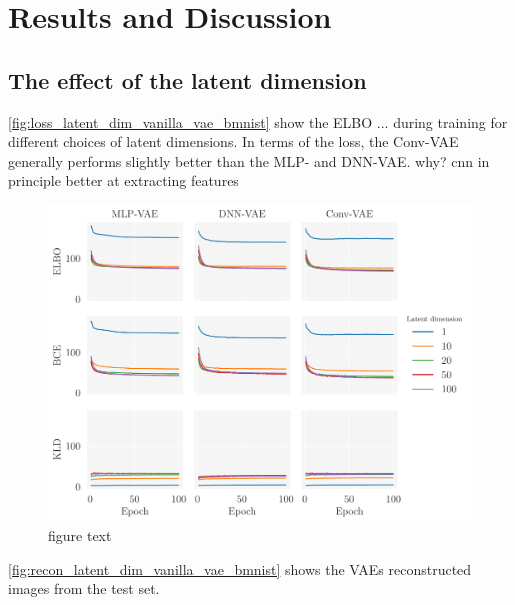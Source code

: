 \newpage
\section{Results and Discussion}\label{sec:Results}

\subsection{The effect of the latent dimension}  

\autoref{fig:loss_latent_dim_vanilla_vae_bmnist} show the ELBO ... during training for different choices of latent dimensions. In terms of the loss, the Conv-VAE generally performs slightly better than the MLP- and DNN-VAE.
why? cnn in principle better at extracting features 

\begin{figure}[!htb]
\begin{center}\includegraphics[scale=0.75]{latex/figures/loss_latent_dim_vanilla_mlp_dnn_vae_bmnist.pdf}
\end{center}
\caption{figure text}
\label{fig:loss_latent_dim_vanilla_vae_bmnist}
\end{figure}

\autoref{fig:recon_latent_dim_vanilla_vae_bmnist} shows the VAEs reconstructed images from the test set.

